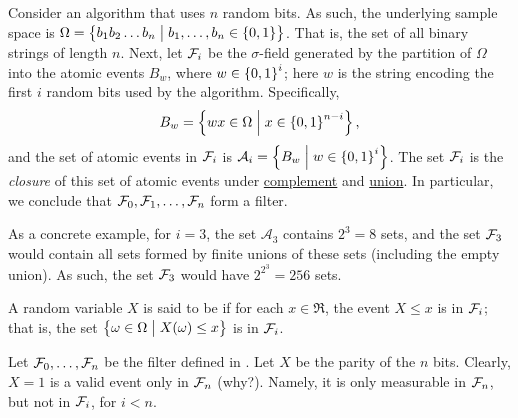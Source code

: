 \begin{example}
    Consider an algorithm \Alg that uses $n$ random bits. As such, the
    underlying sample space is
    $\Omega = \left\{  b_1b_2 \ldots b_n  \;\middle\vert\;  b_1, \ldots, b_n \in
       \left\{ {0,1} \right\}\bigr. \right\}$. That is, the set of all binary strings of
    length $n$.  Next, let $\mathcal{F}_i$ be the $\sigma$-field generated
    by the partition of $\Omega$ into the atomic events $B_w$, where
    $w \in \left\{ {0,1} \right\}^{i}$; here $w$ is the string encoding the first
    $i$ random bits used by the algorithm. Specifically,
    \begin{equation*}
        B_w = \left\{  wx \in \Omega  \;\middle\vert\;  x\in \left\{ {0,1} \right\}^{n-i} \right\},
    \end{equation*}
    and the set of atomic events in $\mathcal{F}_i$ is
    $\mathcal{A}_i = \left\{  B_w  \;\middle\vert\;  w \in \left\{ {0,1} \right\}^i \right\}$. The set
    $\mathcal{F}_i$ is the \emph{closure} of this set of atomic events
    under \underline{complement} and \underline{union}. In particular,
    we conclude that $\mathcal{F}_0, \mathcal{F}_1, \ldots, \mathcal{F}_n$ form a
    filter.

    As a concrete example, for $i=3$, the set $\mathcal{A}_3$ contains
    $2^3=8$ sets, and the set $\mathcal{F}_3$ would contain all sets
    formed by finite unions of these sets (including the empty
    union). As such, the set $\mathcal{F}_3$ would have $2^{2^3} = 256$
    sets.
    
\end{example}

\begin{defn}
    A random variable $X$ is said to be 
    if for each $x \in \Re$, the event $X \leq x$ is in $\mathcal{F}_i$;
    that is, the set
    \begin{math}
        \left\{  \omega \in \Omega  \;\middle\vert\;  \bigl. X(\omega) \leq x \right\}
    \end{math}
    is in $\mathcal{F}_i$.
\end{defn}

\begin{example}
    Let $\mathcal{F}_0, \ldots, \mathcal{F}_n$ be the filter defined in
    . Let $X$ be the parity of the $n$ bits.  Clearly,
    $X=1$ is a valid event only in $\mathcal{F}_n$ (why?).  Namely, it is
    only measurable in $\mathcal{F}_n$, but not in $\mathcal{F}_i$, for $i <
    n$.
\end{example}

